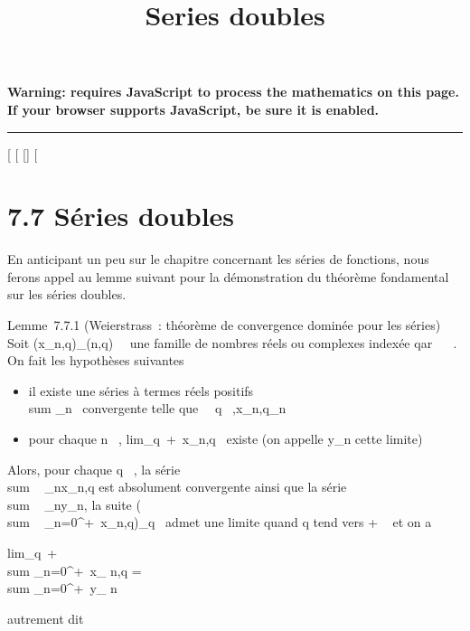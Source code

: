 \documentclass[]{article}
\title{Series doubles}
\author{}
\date{}
\begin{document}
\maketitle

\textbf{Warning: 
requires JavaScript to process the mathematics on this page.\\ If your
browser supports JavaScript, be sure it is enabled.}

\begin{center}\rule{3in}{0.4pt}\end{center}

[
[
[]
[

\section{7.7 Séries doubles}

En anticipant un peu sur le chapitre concernant les séries de fonctions,
nous ferons appel au lemme suivant pour la démonstration du théorème
fondamental sur les séries doubles.

Lemme~7.7.1 (Weierstrass~: théorème de convergence dominée pour les
séries) Soit (x_n,q)_(n,q)\in{}~\times{}~ une famille de nombres
réels ou complexes indexée qar ~ \times {}~. On fait les hypothèses suivantes

\begin{itemize}
\itemsep1pt\parskip0pt
\item
  il existe une séries à termes réels positifs
  \\sum  \alpha_n~
  convergente telle que \forall~~q \in
  ~,x_n,q\leq \alpha_n
\item
  pour chaque n \in {}~,
  lim_q\rightarrow~+\infty~x_n,q~ existe (on
  appelle y_n cette limite)
\end{itemize}

Alors, pour chaque q \in {}~, la série
\\sum ~
_nx_n,q est absolument convergente ainsi que la série
\\sum ~
_ny_n, la suite \left
(\\sum ~
_n=0^+\infty~x_n,q\right )_q\in{}~
admet une limite quand q tend vers + \infty~ et on a

lim_q\rightarrow~+\infty~~\\sum
_n=0^+\infty~x_ n,q = \\sum
_n=0^+\infty~y_ n

autrement dit
\end{document}
